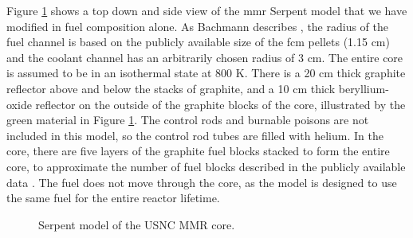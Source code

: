 Figure \ref{fig:mmr_core} shows a top down and side view of the \gls{mmr} Serpent model \cite{bachmann_mmr_like_2023} that we have modified in fuel composition alone. As Bachmann describes \cite{bachmann_thesis_2023}, the radius of the fuel channel is based on the publicly available size of the \gls{fcm} pellets (1.15 cm) and the coolant channel has an arbitrarily chosen radius of 3 cm. The entire core is assumed to be in an isothermal state at 800 K. There is a 20 cm thick graphite reflector above and below the stacks of graphite, and a 10 cm thick beryllium-oxide reflector on the outside of the graphite blocks of the core, illustrated by the green material in Figure \ref{fig:mmr_core}. The control rods and burnable poisons are not included in this model, so the control rod tubes are filled with helium. In the core, there are five layers of the graphite fuel blocks stacked to form the entire core, to approximate the number of fuel blocks described in the publicly available data \cite{usnc_design_2021}. The fuel does not move through the core, as the model is designed to use the same fuel for the entire reactor lifetime.


\begin{figure}[H]
    \hfill
    \caption{Serpent model of the USNC MMR core.}
    \label{fig:mmr_core}
\end{figure}



